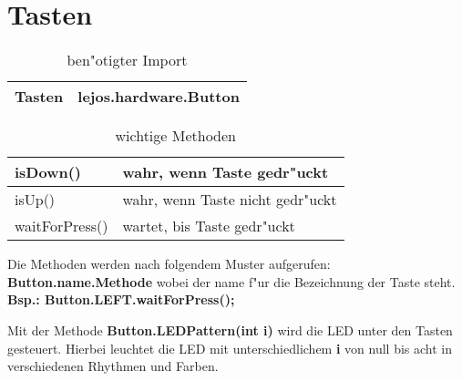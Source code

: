 \section{Tasten}
	\begin{table}[h]
		\begin{tabular}{|p{}| p{}|}
			\hline
			Tasten& lejos.hardware.Button
			\\ \hline 
		\end{tabular}
		\caption{ben"otigter Import}
	\end{table}
	
	\begin{table}[H]
		\begin{tabular}{|p{}| p{}|}
			\hline
			isDown()& wahr, wenn Taste gedr"uckt \\ \hline 
			isUp() &  wahr, wenn Taste nicht gedr"uckt\\ \hline 
			waitForPress() & wartet, bis Taste gedr"uckt\\ \hline
		\end{tabular}
		\caption{wichtige Methoden}
	\end{table}
Die Methoden werden nach folgendem Muster aufgerufen: \textbf{Button.name.Methode} wobei der \glqq name\grqq{} f"ur die Bezeichnung der Taste steht.\\
\textbf{Bsp.: Button.LEFT.waitForPress();}

Mit der Methode \textbf{\glqq Button.LEDPattern(int i)\grqq{}} wird die LED unter den Tasten gesteuert. Hierbei leuchtet die LED mit unterschiedlichem \textbf{i} von null bis acht in verschiedenen Rhythmen und Farben.
